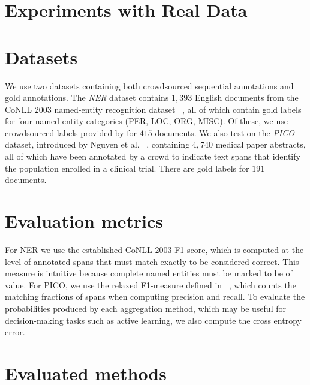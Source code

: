 \section{Experiments with Real Data}
 
\section{Datasets}

We use two datasets containing both crowdsourced sequential annotations and gold annotations. 
The \emph{NER} dataset contains $1,393$ English documents from the CoNLL 2003 named-entity recognition dataset
~\cite{conll_ner_2003}, all of which contain gold labels for four named entity categories (PER, LOC, ORG, MISC). Of these, we use crowdsourced labels provided by \cite{rodrigues2014} for $415$ documents.
We also test on the \emph{PICO} dataset, introduced by Nguyen et al. ~\cite{nguyen2017aggregating},
containing $4,740$ medical paper abstracts, all of which have been 
annotated by a crowd to indicate text spans that identify the population enrolled in a clinical trial. There are gold labels for $191$ documents.

\section{Evaluation metrics}

For NER we use the established CoNLL 2003 F1-score, which is computed at the level of annotated spans that must match exactly to be considered correct. This measure is intuitive because complete named entities must be marked to be of value. For PICO, we use the relaxed F1-measure defined in ~\cite{nguyen2017aggregating}, which counts the matching fractions of spans when computing precision and recall. 
To evaluate the probabilities produced by each aggregation method, which may be useful for decision-making tasks such as active learning, we also compute the cross entropy error.

\section{Evaluated methods}

